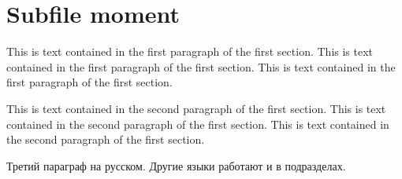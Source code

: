 \documentclass[../main.tex]{subfiles}%
\begin{document}
%
\normalsize%
\section{Subfile moment}%
\label{sec:Subfilemoment}%
This is text contained in the first paragraph of the first section. This is text contained in the first paragraph of the first section. This is text contained in the first paragraph of the first section. %
\par%
This is text contained in the second paragraph of the first section. This is text contained in the second paragraph of the first section. This is text contained in the second paragraph of the first section. %
\par%
Третий параграф на русском. Другие языки работают и в подразделах.%
\par

%
\end{document}
